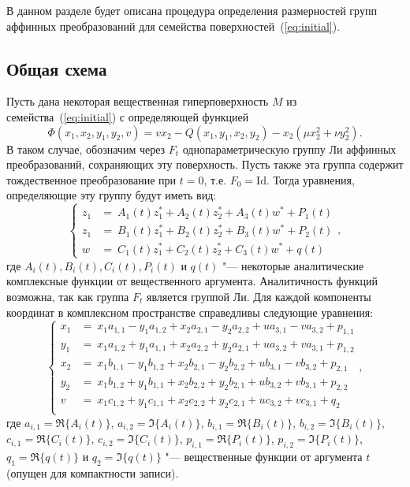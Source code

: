 \documentclass[../main.tex]{subfiles}
\begin{document}
В данном разделе будет описана процедура определения размерностей групп аффинных преобразований для семейства поверхностей~(\ref{eq:initial}).
\subsection{Общая схема}
Пусть дана некоторая вещественная гиперповерхность $M$ из семейства~(\ref{eq:initial}) с определяющей функцией $$\Phi(x_1, x_2, y_1, y_2, v) = v x_2 - Q(x_1, y_1, x_2, y_2) - x_2 (\mu x_2^2 + \nu y_2^2).$$ В таком случае, обозначим через $F_t$ однопараметрическую группу Ли аффинных преобразований, сохраняющих эту поверхность. Пусть также эта группа содержит тождественное преобразование при $t = 0$, т.е. $F_0 = \textrm{Id}$. Тогда уравнения, определяющие эту группу будут иметь вид:
\begin{equation}
  \begin{cases}
     z_1 &=~A_{1}(t) z_1^* + A_{2}(t) z_2^* + A_{3}(t) w^* + P_1(t) \\ 
     z_1 &=~B_{1}(t) z_1^* + B_{2}(t) z_2^* + B_{3}(t) w^* + P_2(t) \\ 
     w   &=~C_{1}(t) z_1^* + C_{2}(t) z_2^* + C_{3}(t) w^* + q(t)
  \end{cases},
\end{equation}
где $A_{i}(t), B_{i}(t), C_{i}(t), P_i(t)$ и $q(t)$ "--- некоторые аналитические комплексные функции от вещественного аргумента. Аналитичность функций возможна, так как группа $F_t$ является группой Ли. Для каждой компоненты координат в комплексном пространстве справедливы следующие уравнения:
\begin{equation}\label{eq:coordinates_transform}
  \begin{cases}
     x_1 &=~x_1 a_{1,1} - y_1 a_{1,2} + x_2 a_{2,1} - y_2 a_{2,2} + u a_{3,1} - v a_{3,2} + p_{1,1} \\ 
     y_1 &=~x_1 a_{1,2} + y_1 a_{1,1} + x_2 a_{2,2} + y_2 a_{2,1} + u a_{3,2} + v a_{3,1} + p_{1,2} \\
     x_2 &=~x_1 b_{1,1} - y_1 b_{1,2} + x_2 b_{2,1} - y_2 b_{2,2} + u b_{3,1} - v b_{3,2} + p_{2,1}\\
     y_2 &=~x_1 b_{1,2} + y_1 b_{1,1} + x_2 b_{2,2} + y_2 b_{2,1} + u b_{3,2} + v b_{3,1} + p_{2,2}\\
     v   &=~x_1 c_{1,2} + y_1 c_{1,1} + x_2 c_{2,2} + y_2 c_{2,1} + u c_{3,2} + v c_{3,1}+q_2\\
  \end{cases},
\end{equation}
где $a_{i, 1} = \Re\{A_i(t)\}$, $a_{i, 2} = \Im\{A_i(t)\}$, $b_{i, 1} = \Re\{B_i(t)\}$, $b_{i, 2} = \Im\{B_i(t)\}$, $c_{i, 1} = \Re\{C_i(t)\}$, $c_{i, 2} = \Im\{C_i(t)\}$, $p_{i, 1} = \Re\{P_i(t)\}$, $p_{i, 2} = \Im\{P_i(t)\}$, $q_1 = \Re\{q(t)\}$ и $q_2 = \Im\{q(t)\}$ "--- вещественные функции от аргумента $t$ (опущен для компактности записи). 
\end{document}

